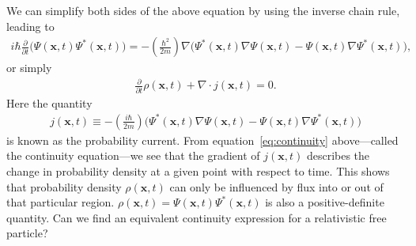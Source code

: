 \documentclass[titlepage,letterpaper,onecolumn,11pt,final]{report}
\numberwithin{equation}{section}
\numberwithin{figure}{section}
\begin{document}
%
We can simplify both sides of the above equation by using the inverse chain rule, leading to
\begin{gather}
	\label{eq:SE_diff_sim}
	i \hbar \frac{\partial}{\partial t} \bigg( \Psi (\mathbf{x},t) \Psi^{*} (\mathbf{x},t) \bigg)= - \left( \frac{\hbar^{2}}{2m} \right) \nabla \bigg( \Psi^{*} (\mathbf{x},t) \nabla \Psi (\mathbf{x},t) - \Psi (\mathbf{x},t) \nabla \Psi^{*} (\mathbf{x},t) \bigg) ,
\end{gather}
%
or simply
\begin{gather}
	\label{eq:continuity}
	\frac{\partial}{\partial t} \rho (\mathbf{x},t) + \nabla \cdot j (\mathbf{x},t) = 0.
\end{gather}
%
Here the quantity 
\begin{gather}
	j (\mathbf{x},t) \equiv - \left( \frac{i \hbar}{2m} \right) \bigg( \Psi^{*} (\mathbf{x},t) \nabla \Psi (\mathbf{x},t) - \Psi (\mathbf{x},t) \nabla \Psi^{*} (\mathbf{x},t) \bigg)
\end{gather}
%
is known as the probability current. From equation~\ref{eq:continuity} above---called the continuity equation---we see that the gradient of $j (\mathbf{x},t)$ describes the change in probability density at a given point with respect to time. This shows that probability density $\rho (\mathbf{x},t)$ can only be influenced by flux into or out of that particular region. $\rho (\mathbf{x},t) = \Psi (\mathbf{x},t)\Psi^{*} (\mathbf{x},t)$ is also a positive-definite quantity. Can we find an equivalent continuity expression for a relativistic free particle?
\end{document}
